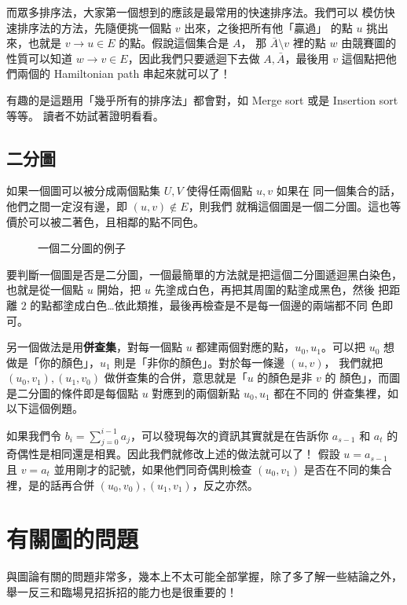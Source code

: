 \documentclass[a4paper,12pt]{book}
\begin{document}
而眾多排序法，大家第一個想到的應該是最常用的快速排序法。我們可以
模仿快速排序法的方法，先隨便挑一個點 $v$ 出來，之後把所有他「贏過」
的點 $u$ 挑出來，也就是 $v \to u \in E$ 的點。假說這個集合是 $A$，
那 $\bar{A} \setminus v$ 裡的點 $w$ 由競賽圖的性質可以知道 
$w \to v \in E$，因此我們只要遞迴下去做 $A, \bar{A}$，最後用
$v$ 這個點把他們兩個的 Hamiltonian path 串起來就可以了！

有趣的是這題用「幾乎所有的排序法」都會對，如 Merge sort 或是 
Insertion sort 等等。
讀者不妨試著證明看看。

\subsection{二分圖}
如果一個圖可以被分成兩個點集 $U, V$ 使得任兩個點 $u, v$ 如果在
同一個集合的話，他們之間一定沒有邊，即 $(u, v) \notin E$，則我們
就稱這個圖是一個二分圖。這也等價於可以被二著色，且相鄰的點不同色。

\begin{figure}[H]
  \centering
  
  \caption{一個二分圖的例子}
\end{figure}

要判斷一個圖是否是二分圖，一個最簡單的方法就是把這個二分圖遞迴黑白染色，
也就是從一個點 $u$ 開始，把 $u$ 先塗成白色，再把其周圍的點塗成黑色，然後
把距離 $2$ 的點都塗成白色…依此類推，最後再檢查是不是每一個邊的兩端都不同
色即可。

另一個做法是用{\bf 併查集}，對每一個點 $u$ 都建兩個對應的點，$u_0, u_1$。可以把
$u_0$ 想做是「你的顏色」，$u_1$ 則是「非你的顏色」。對於每一條邊 $(u, v)$，
我們就把 $(u_0, v_1), (u_1, v_0)$ 做併查集的合併，意思就是「$u$ 的顏色是非 $v$ 的
顏色」，而圖是二分圖的條件即是每個點 $u$ 對應到的兩個新點 $u_0, u_1$ 都在不同的
併查集裡，如以下這個例題。


如果我們令 $b_i = \sum\limits_{j=0}^{i-1} a_j$，可以發現每次的資訊其實就是在告訴你
$a_{s-1}$ 和 $a_t$ 的奇偶性是相同還是相異。因此我們就修改上述的做法就可以了！
假設 $u = a_{s-1}$ 且 $v = a_t$ 並用剛才的記號，如果他們同奇偶則檢查 $(u_0, v_1)$
是否在不同的集合裡，是的話再合併 $(u_0, v_0), (u_1, v_1)$，反之亦然。

\section{有關圖的問題}
與圖論有關的問題非常多，幾本上不太可能全部掌握，除了多了解一些結論之外，
舉一反三和臨場見招拆招的能力也是很重要的！
\end{document}
